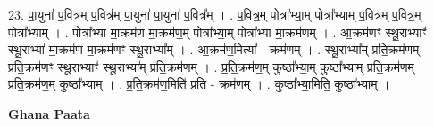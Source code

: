 \documentclass[17pt]{extarticle}
\begin{document}
23. पा॒युना॑ प॒वित्र॑म् प॒वित्र॑म् पा॒युना॑ पा॒युना॑ प॒वित्र᳚म् । . प॒वित्र॒म् पोत्रा᳚भ्या॒म् पोत्रा᳚भ्याम् प॒वित्र॑म् प॒वित्र॒म् पोत्रा᳚भ्याम् । . पोत्रा᳚भ्या मा॒क्रम॑ण मा॒क्रम॑ण॒म् पोत्रा᳚भ्या॒म् पोत्रा᳚भ्या मा॒क्रम॑णम् । . आ॒क्रम॑णꣳ स्थू॒राभ्याꣳ॑ स्थू॒राभ्या॑ मा॒क्रम॑ण मा॒क्रम॑णꣳ स्थू॒राभ्या᳚म् । . आ॒क्रम॑ण॒मित्या᳚ - क्रम॑णम् । . स्थू॒राभ्या᳚म् प्रति॒क्रम॑णम् प्रति॒क्रम॑णꣳ स्थू॒राभ्याꣳ॑ स्थू॒राभ्या᳚म् प्रति॒क्रम॑णम् । . प्र॒ति॒क्रम॑ण॒म् कुष्ठा᳚भ्या॒म् कुष्ठा᳚भ्याम् प्रति॒क्रम॑णम् प्रति॒क्रम॑ण॒म् कुष्ठा᳚भ्याम् । . प्र॒ति॒क्रम॑ण॒मिति॑ प्रति - क्रम॑णम् । . कुष्ठा᳚भ्या॒मिति॒ कुष्ठा᳚भ्याम् । \newline

\textbf{Ghana Paata } \newline
\end{document}
